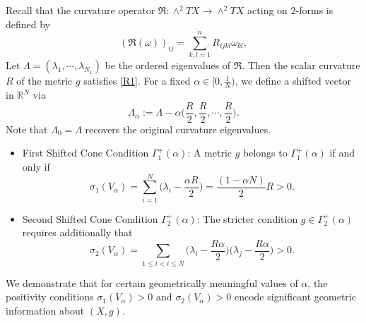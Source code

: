 \documentclass[12pt, twoside]{article}
\theoremstyle{definition}
\numberwithin{equation}{section}
\def \a {\alpha }
\def \La {\Lambda}
\begin{document}
Recall that the curvature operator $\mathfrak{R} \colon \wedge^2 TX \to \wedge^2 TX$ acting on $2$-forms is defined by
\[
(\mathfrak{R}(\omega))_{ij} = \sum_{k,l=1}^{n} R_{ijkl} \omega_{kl},
\]
Let $\Lambda=(\lambda_{1},\cdots,\lambda_{N_{1}})$  be the ordered eigenvalues of $\mathfrak{R}$. Then the scalar curvature $R$ of the metric $g$ satisfies \eqref{R1}. For a fixed $\a\in [0,\frac{1}{N})$, we define a shifted vector in $\mathbb{R}^{N}$ via
\begin{equation*}
\Lambda_{\alpha}:=\La-\a\Big(\frac{R}{2},\frac{R}{2},\cdots,\frac{R}{2}\Big).
\end{equation*}
Note that $\Lambda_{0}=\Lambda$ recovers the original curvature eigenvalues.
\begin{itemize}
\item[(i)] First Shifted Cone Condition $\Gamma^{+}_{1}(\alpha)$:
A metric $g$ belongs to $\Gamma^{+}_{1}(\alpha)$ if and only if
\begin{equation}\label{E5}
\sigma_{1}(V_{\alpha})=\sum_{i=1}^{N}\Big(\lambda_{i}-\frac{\a R}{2}\Big)=\frac{(1-\a N)}{2}R>0.
\end{equation}
\item[(ii)] Second Shifted Cone Condition $\Gamma^{+}_{2}(\alpha)$:
The stricter condition $g\in\Gamma^{+}_{2}(\alpha)$ requires additionally that
\begin{equation}\label{E6}
\sigma_{2}(V_{\alpha})=\sum_{1\leq i<i\leq N}\Big(\lambda_{i}-\frac{R\alpha}{2}\Big)\Big(\lambda_{j}-\frac{R\alpha}{2}\Big)>0.
\end{equation}
\end{itemize}
We demonstrate that for certain geometrically meaningful values of $\a$, the positivity conditions $\sigma_{1}(V_{\alpha})>0$ and $\sigma_{2}(V_{\alpha})>0$ encode significant geometric information about $(X,g)$.
\end{document}
